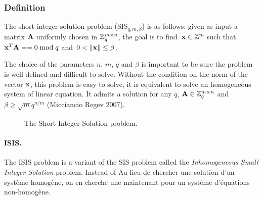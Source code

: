 \subsubsection{Definition}

\begin{definition}
\label{def:SIS}
The short integer solution problem (SIS$_{q,m,\beta}$) is as follows: given as input a matrix $\bf A$ uniformly chosen in $\mathbb{Z}_q^{m \times n}$, the goal is to find~${\bf x} \in \mathbb{Z}^{m}$ such that ${\bf x}^T {\bf A} =  = 0 \bmod q$ and~$0 < \|{\bf x}\| \leq \beta $. 
\end{definition}

The choice of the parameters $n$, $m$, $q$ and $\beta$ is important to be sure the problem is well defined and difficult to solve. Without the condition on the norm of the vector $\bf x$, this problem is easy to solve, it is equivalent to solve an homogeneous system of linear equation.
It admits a solution for any $q$, ${\bf A} \in \mathbb{Z}_q^{m \times n}$ and $\beta \geq \sqrt{m} q^{n/m}$ (Micciancio Regev 2007).

\begin{figure}[h]
\begin{center}


\caption{The Short Integer Solution problem.}\label{fig:SIS}
\end{center}
\end{figure}

\paragraph{ISIS.} The ISIS problem is a variant of the SIS problem called the \emph{Inhomogeneous Small Integer Solution} problem. Instead of 
 Au lieu de chercher une solution d'un système homogène, on en cherche une maintenant pour un système d'équations non-homogène.
 
